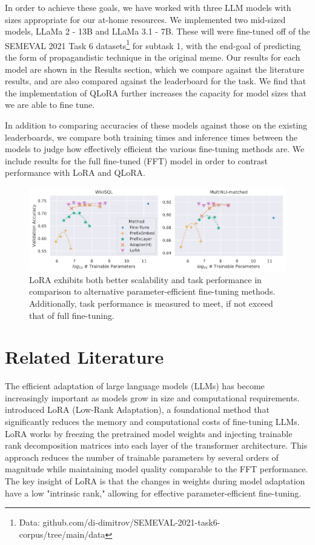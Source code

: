 \documentclass[11pt]{article}
\begin{document}
In order to achieve these goals, we have worked with three LLM models with sizes appropriate for our at-home resources. We implemented two mid-sized models, LLaMa 2 - 13B and LLaMa 3.1 - 7B. These will were fine-tuned off of the SEMEVAL 2021 Task 6 datasets\footnote{Data: github.com/di-dimitrov/SEMEVAL-2021-task6-corpus/tree/main/data} for subtask 1, with the end-goal of predicting the form of propagandistic technique in the original meme. Our results for each model are shown in the Results section, which we compare against the literature results, and are also compared against the leaderboard for the task. We find that the implementation of QLoRA further increases the capacity for model sizes that we are able to fine tune.

In addition to comparing accuracies of these models against those on the existing leaderboards, we compare both training times and inference times between the models to judge how effectively efficient the various fine-tuning methods are. We include results for the full fine-tuned (FFT) model in order to contrast performance with LoRA and QLoRA.

\begin{figure}[h]
	\includegraphics[width=6in]{finetuning_scalability.png}
	\centering
	\caption{LoRA exhibits both better scalability and task performance in comparison to alternative parameter-efficient fine-tuning methods. Additionally, task performance is measured to meet, if not exceed that of full fine-tuning. \cite{hu2021lora}}
	\label{fig:ft_scale}
\end{figure}

\section{Related Literature}

The efficient adaptation of large language models (LLMs) has become increasingly important as models grow in size and computational requirements. \cite{hu2021lora} introduced LoRA (Low-Rank Adaptation), a foundational method that significantly reduces the memory and computational costs of fine-tuning LLMs. LoRA works by freezing the pretrained model weights and injecting trainable rank decomposition matrices into each layer of the transformer architecture. This approach reduces the number of trainable parameters by several orders of magnitude while maintaining model quality comparable to the FFT performance. The key insight of LoRA is that the changes in weights during model adaptation have a low "intrinsic rank," allowing for effective parameter-efficient fine-tuning.
\end{document}

